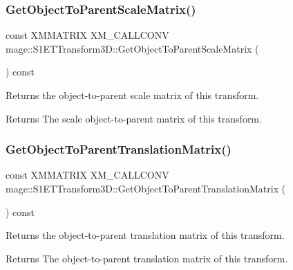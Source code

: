 \subsubsection{\texorpdfstring{Get\+Object\+To\+Parent\+Scale\+Matrix()}{GetObjectToParentScaleMatrix()}}
{\footnotesize\ttfamily const X\+M\+M\+A\+T\+R\+IX X\+M\+\_\+\+C\+A\+L\+L\+C\+O\+NV mage\+::\+S1\+E\+T\+Transform3\+D\+::\+Get\+Object\+To\+Parent\+Scale\+Matrix (\begin{DoxyParamCaption}{ }\end{DoxyParamCaption}) const\hspace{0.3cm}{\ttfamily [noexcept]}}

Returns the object-\/to-\/parent scale matrix of this transform.

\begin{DoxyReturn}{Returns}
The scale object-\/to-\/parent matrix of this transform. 
\end{DoxyReturn}
\mbox{\label{classmage_1_1_s1_e_t_transform3_d_ae98a3577ae358d1de8f2cb4635742362}} 
\subsubsection{\texorpdfstring{Get\+Object\+To\+Parent\+Translation\+Matrix()}{GetObjectToParentTranslationMatrix()}}
{\footnotesize\ttfamily const X\+M\+M\+A\+T\+R\+IX X\+M\+\_\+\+C\+A\+L\+L\+C\+O\+NV mage\+::\+S1\+E\+T\+Transform3\+D\+::\+Get\+Object\+To\+Parent\+Translation\+Matrix (\begin{DoxyParamCaption}{ }\end{DoxyParamCaption}) const\hspace{0.3cm}{\ttfamily [noexcept]}}

Returns the object-\/to-\/parent translation matrix of this transform.

\begin{DoxyReturn}{Returns}
The object-\/to-\/parent translation matrix of this transform. 
\end{DoxyReturn}
\mbox{\label{classmage_1_1_s1_e_t_transform3_d_a85f0aed785c1ad27885ea6602d50c893}} 
